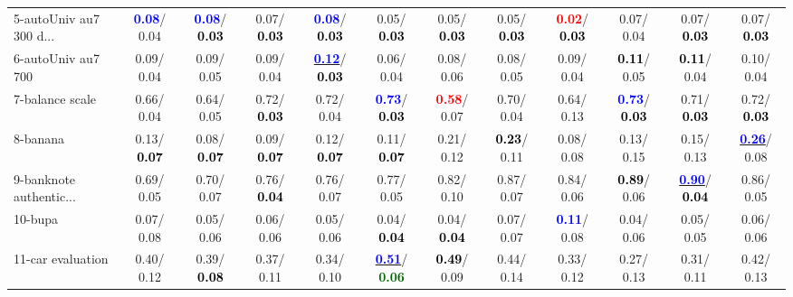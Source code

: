 \begin{table}[h]
\begin{center}
{\begin{tabular}{lc|c|c|c|c|c|c|c|c|c|c}
5-autoUniv au7 300 d... & \textcolor{blue}{\textbf{  0.08}}/  0.04 & \textcolor{blue}{\textbf{  0.08}}/\textcolor{black}{\textbf{  0.03}} &   0.07/\textcolor{black}{\textbf{  0.03}} & \textcolor{blue}{\textbf{  0.08}}/\textcolor{black}{\textbf{  0.03}} &   0.05/\textcolor{black}{\textbf{  0.03}} &   0.05/\textcolor{black}{\textbf{  0.03}} &   0.05/\textcolor{black}{\textbf{  0.03}} & \textcolor{red}{\textbf{  0.02}}/\textcolor{black}{\textbf{  0.03}} &   0.07/  0.04 &   0.07/\textcolor{black}{\textbf{  0.03}} &   0.07/\textcolor{black}{\textbf{  0.03}} \\
6-autoUniv au7 700 &   0.09/  0.04 &   0.09/  0.05 &   0.09/  0.04 & \underline{\textcolor{blue}{\textbf{  0.12}}}/\textcolor{black}{\textbf{  0.03}} &   0.06/  0.04 &   0.08/  0.06 &   0.08/  0.05 &   0.09/  0.04 & \textcolor{black}{\textbf{  0.11}}/  0.05 & \textcolor{black}{\textbf{  0.11}}/  0.04 &   0.10/  0.04 \\
7-balance scale &   0.66/  0.04 &   0.64/  0.05 &   0.72/\textcolor{black}{\textbf{  0.03}} &   0.72/  0.04 & \textcolor{blue}{\textbf{  0.73}}/\textcolor{black}{\textbf{  0.03}} & \textcolor{red}{\textbf{  0.58}}/  0.07 &   0.70/  0.04 &   0.64/  0.13 & \textcolor{blue}{\textbf{  0.73}}/\textcolor{black}{\textbf{  0.03}} &   0.71/\textcolor{black}{\textbf{  0.03}} &   0.72/\textcolor{black}{\textbf{  0.03}} \\ \hline
8-banana &   0.13/\textcolor{black}{\textbf{  0.07}} &   0.08/\textcolor{black}{\textbf{  0.07}} &   0.09/\textcolor{black}{\textbf{  0.07}} &   0.12/\textcolor{black}{\textbf{  0.07}} &   0.11/\textcolor{black}{\textbf{  0.07}} &   0.21/  0.12 & \textcolor{black}{\textbf{  0.23}}/  0.11 &   0.08/  0.08 &   0.13/  0.15 &   0.15/  0.13 & \underline{\textcolor{blue}{\textbf{  0.26}}}/  0.08 \\
9-banknote authentic... &   0.69/  0.05 &   0.70/  0.07 &   0.76/\textcolor{black}{\textbf{  0.04}} &   0.76/  0.07 &   0.77/  0.05 &   0.82/  0.10 &   0.87/  0.07 &   0.84/  0.06 & \textcolor{black}{\textbf{  0.89}}/  0.06 & \underline{\textcolor{blue}{\textbf{  0.90}}}/\textcolor{black}{\textbf{  0.04}} &   0.86/  0.05 \\
10-bupa &   0.07/  0.08 &   0.05/  0.06 &   0.06/  0.06 &   0.05/  0.06 &   0.04/\textcolor{black}{\textbf{  0.04}} &   0.04/\textcolor{black}{\textbf{  0.04}} &   0.07/  0.07 & \textcolor{blue}{\textbf{  0.11}}/  0.08 &   0.04/  0.06 &   0.05/  0.05 &   0.06/  0.06 \\
11-car evaluation &   0.40/  0.12 &   0.39/\textcolor{black}{\textbf{  0.08}} &   0.37/  0.11 &   0.34/  0.10 & \underline{\textcolor{blue}{\textbf{  0.51}}}/\textcolor{darkgreen}{\textbf{  0.06}} & \textcolor{black}{\textbf{  0.49}}/  0.09 &   0.44/  0.14 &   0.33/  0.12 &   0.27/  0.13 &   0.31/  0.11 &   0.42/  0.13 \\

\end{tabular}}
\end{center}
\end{table}
